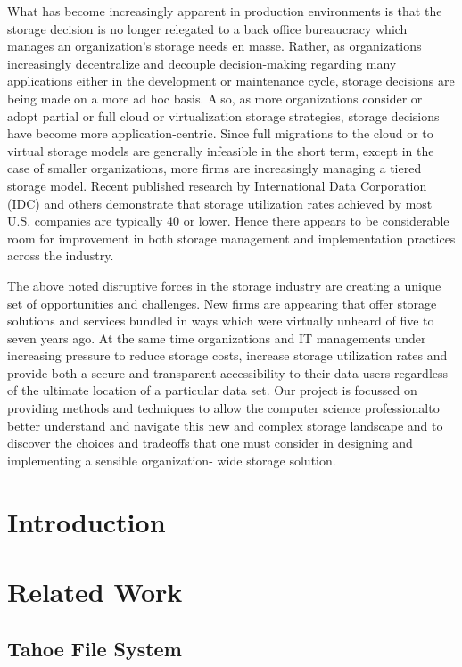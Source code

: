 \documentclass[11pt]{article}
\begin{document}
What has become increasingly apparent in production environments is that the 
storage decision is no longer relegated to a back office bureaucracy which 
manages an organization’s storage needs en masse. Rather, as organizations 
increasingly decentralize and decouple decision-making regarding many applications 
either in the development or maintenance cycle, storage decisions are being made 
on a more ad hoc basis. Also, as more organizations consider or adopt partial or 
full cloud or virtualization storage strategies, storage decisions have become 
more application-centric. Since full migrations to the cloud or to virtual storage 
models are generally infeasible in the short term, except in the case of smaller 
organizations, more firms are increasingly managing a tiered storage model. Recent 
published research by International Data Corporation (IDC) and others demonstrate 
that storage utilization rates achieved by most U.S. companies are typically 40%
or lower. Hence there appears to be considerable room for improvement in both 
storage management and implementation practices across the industry. 

The above noted disruptive forces in the storage industry are creating a unique 
set of opportunities and challenges. New firms are appearing that offer storage 
solutions and services bundled in ways which were virtually unheard of five to 
seven years ago. At the same time organizations and IT managements under increasing 
pressure to reduce storage costs, increase storage utilization rates and provide 
both a secure and transparent accessibility to their data users regardless of 
the ultimate location of a particular data set. Our project is focussed on providing 
methods and techniques to allow the computer science professionalto better understand 
and navigate this new and complex storage landscape and to discover the choices and 
tradeoffs that one must consider in designing and implementing a sensible organization-
wide storage solution.

\section{Introduction}


\section{Related Work}
\subsection{Tahoe File System}
\end{document}
